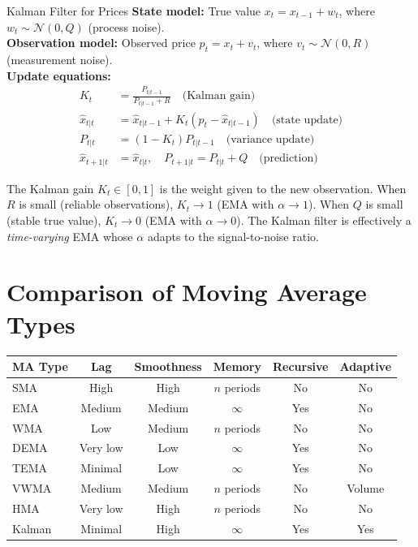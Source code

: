 \documentclass[12pt,a4paper,openany]{report}
\theoremstyle{definition}
\begin{document}
\begin{keyconceptbox}{Kalman Filter for Prices}
\textbf{State model:} True value $x_t = x_{t-1} + w_t$, where $w_t \sim \mathcal{N}(0, Q)$ (process noise). \\
\textbf{Observation model:} Observed price $p_t = x_t + v_t$, where $v_t \sim \mathcal{N}(0, R)$ (measurement noise). \\
\textbf{Update equations:}
\begin{align}
  K_t &= \frac{P_{t|t-1}}{P_{t|t-1} + R} \quad \text{(Kalman gain)} \\
  \hat{x}_{t|t} &= \hat{x}_{t|t-1} + K_t(p_t - \hat{x}_{t|t-1}) \quad \text{(state update)} \\
  P_{t|t} &= (1 - K_t) P_{t|t-1} \quad \text{(variance update)} \\
  \hat{x}_{t+1|t} &= \hat{x}_{t|t}, \quad P_{t+1|t} = P_{t|t} + Q \quad \text{(prediction)}
\end{align}
\end{keyconceptbox}

The Kalman gain $K_t \in [0,1]$ is the weight given to the new observation. When $R$ is small (reliable observations), $K_t \to 1$ (EMA with $\alpha \to 1$). When $Q$ is small (stable true value), $K_t \to 0$ (EMA with $\alpha \to 0$). The Kalman filter is effectively a \emph{time-varying} EMA whose $\alpha$ adapts to the signal-to-noise ratio.

\section{Comparison of Moving Average Types}

\begin{center}
\begin{tabular}{lccccc}
\toprule
\textbf{MA Type} & \textbf{Lag} & \textbf{Smoothness} & \textbf{Memory} & \textbf{Recursive} & \textbf{Adaptive} \\
\midrule
SMA         & High   & High   & $n$ periods  & No  & No  \\
EMA         & Medium & Medium & $\infty$     & Yes & No  \\
WMA         & Low    & Medium & $n$ periods  & No  & No  \\
DEMA        & Very low & Low  & $\infty$     & Yes & No  \\
TEMA        & Minimal  & Low  & $\infty$     & Yes & No  \\
VWMA        & Medium & Medium & $n$ periods  & No  & Volume \\
HMA         & Very low & High & $n$ periods  & No  & No  \\
Kalman      & Minimal  & High & $\infty$     & Yes & Yes \\
\bottomrule
\end{tabular}
\end{center}
\end{document}
